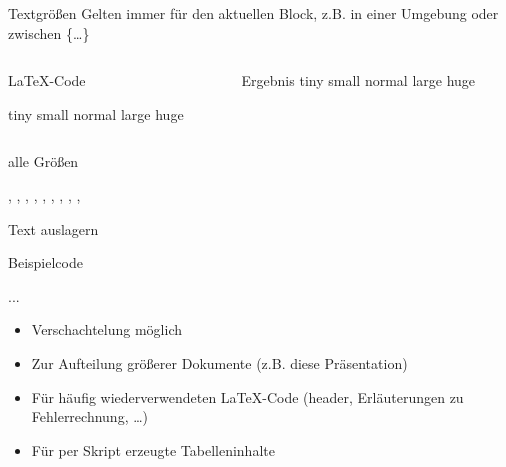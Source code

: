 \begin{frame}[fragile]{Textgrößen}
  Gelten immer für den aktuellen Block, z.B. in einer Umgebung oder zwischen \{\dots\}
  \begin{columns}[t]
    \begin{column}{0.47\textwidth}
      \begin{block}{\LaTeX-Code}
        \begin{lstverbatim}
        {\tiny tiny}
        {\small small}
        {\normalsize normal}
        {\large large}
        {\huge huge}
        \end{lstverbatim}
      \end{block}
    \end{column}
    \begin{column}{0.47\textwidth}
      \begin{block}{Ergebnis}
        {\tiny tiny}
        {\small small}
        {\normalsize normal}
        {\large large}
        {\huge huge}
      \end{block}
    \end{column}
  \end{columns}
  \vspace{1em}
  \begin{block}{alle Größen}
    \begin{lstverbatim}
    \tiny, \scriptsize, \footnotesize, \small, \normalsize, \large, \Large, \LARGE, \huge, \Huge
    \end{lstverbatim}
  \end{block}
\end{frame}

\begin{frame}[fragile]{Text auslagern}
  \begin{block}{Beispielcode}
    \begin{lstverbatim}
    
    
    
    
    ...
    
    \end{lstverbatim}
  \end{block}
  \begin{itemize}
    \item Verschachtelung möglich
    \item Zur Aufteilung größerer Dokumente (z.B. diese Präsentation)
    \item Für häufig wiederverwendeten \LaTeX-Code (header, Erläuterungen zu Fehlerrechnung, \ldots)
    \item Für per Skript erzeugte Tabelleninhalte
  \end{itemize}
\end{frame}

